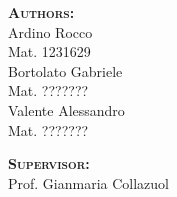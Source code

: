 \begin{titlepage}
    \begin{minipage}[t]{0.4\textwidth}
        \begin{flushleft} \large
            \textsc{\textbf{Authors:}}\\
            {Ardino Rocco}\\
            {Mat. 1231629}\\
            \vspace{1mm}
            {Bortolato Gabriele}\\
            {Mat. ???????}\\
            \vspace{1mm}
            {Valente Alessandro}\\
            {Mat. ???????}
        \end{flushleft}
    \end{minipage}
    \begin{minipage}[t]{0.4\textwidth}
        \begin{flushright} \large
            \textsc{\textbf{Supervisor:}} \\
            {Prof. Gianmaria Collazuol}
        \end{flushright}
    \end{minipage}\\[3cm]

	\vfill %

%
%
%
%

\end{titlepage}

\clearpage{\pagestyle{empty}\cleardoublepage}

